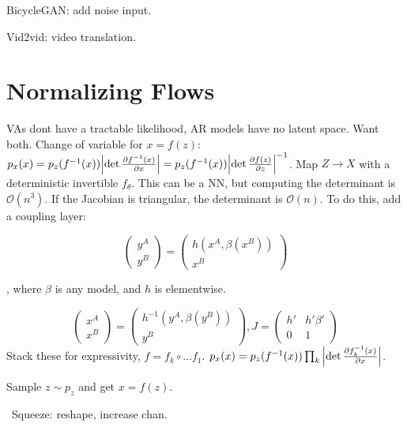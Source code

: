 \documentclass[11pt,landscape,a4paper,fleqn]{article}
\begin{document}
\begin{multicols*}{4}
BicycleGAN: add noise input.

Vid2vid: video translation.

\section{Normalizing Flows}

VAs dont have a tractable likelihood, AR models have no latent space.
Want both.
Change of variable for $x = f(z)$:
$p_x(x) = p_z(f^{-1}(x)) \abs{\det \pdv{f^{-1}(x)}{x}} = p_z(f^{-1}(x)) \abs{\det \pdv{f(z)}{z}}^{-1}$.
Map $Z \to X$ with a deterministic invertible $f_\theta$.
This can be a NN, but computing the determinant is $\mathcal{O}(n^3)$.
If the Jacobian is triangular, the determinant is $\mathcal{O}(n)$.
To do this, add a coupling layer:
\begin{minipage}{0.5\linewidth}
    \[\begin{pmatrix}
        y^A \\
        y^B
    \end{pmatrix} = \begin{pmatrix}
        h(x^A, \beta(x^B)) \\
        x^B
    \end{pmatrix}\]
\end{minipage}%
\hspace{0.3cm}%
\begin{minipage}{0.45\linewidth}
    , where $\beta$ is any model, and $h$ is elementwise.
\end{minipage}
\[\begin{pmatrix}
    x^A \\
    x^B
\end{pmatrix} = \begin{pmatrix}
    h^{-1}(y^A, \beta(y^B)) \\
    y^B
\end{pmatrix}, J = \begin{pmatrix}
    h' & h'\beta' \\
    0 & 1
\end{pmatrix}\]
Stack these for expressivity, $f = f_k \circ \dots f_1$.
$p_x(x) = p_z(f^{-1}(x)) \prod_k \abs{\det \pdv{f_k^{-1}(x)}{x}}$.

Sample $z \sim p_z$ and get $x = f(z)$.

%

\textbullet\ Squeeze: reshape, increase chan.


\end{multicols*}
\end{document}
